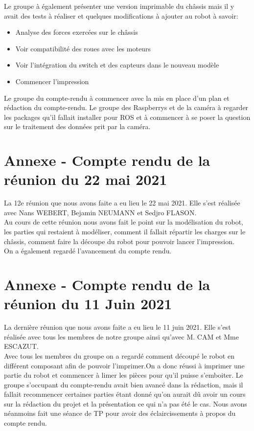 \documentclass{PackagerQualityN}
\begin{document}
Le groupe à également présenter une version imprimable du châssis mais il y avait des tests à réaliser et quelques modifications à ajouter au robot à savoir:
\begin{itemize}
    \item Analyse des forces exercées sur le châssis
    \item Voir compatibilité des roues avec les moteurs
    \item Voir l'intégration du switch et des capteurs dans le nouveau modèle
    \item Commencer l’impression
\end{itemize}

Le groupe du compte-rendu à commencer avec la mis en place d’un plan et rédaction du compte-rendu.
Le groupe des Raspberrys et de la caméra à regarder les packages qu'il fallait installer pour ROS et à commencer à se poser la question sur le traitement des données prit par la caméra.

\newp
\section*{Annexe - Compte rendu de la réunion du 22 mai 2021}
La 12e réunion que nous avons faite a eu lieu le 22 mai 2021. Elle s'est réalisée avec Nans WEBERT, Bejamin NEUMANN et Sedjro FLASON.\\

Au cours de cette réunion nous avons fait le point sur la modélisation du robot, les parties qui restaient à modéliser, comment il fallait répartir les charges sur le châssis, comment faire la découpe du robot pour pouvoir lancer l'impression. \\

On a également regardé l'avancement du compte rendu.

\newp
\section*{Annexe - Compte rendu de la réunion du 11 Juin 2021}
La dernière réunion que nous avons faite a eu lieu le 11 juin 2021. Elle s'est réalisée avec tous les membres de notre groupe ainsi qu'avec M. CAM et Mme ESCAZUT.\\ Avec tous les membres du groupe on a regardé comment découpé le robot en différent composant afin de pouvoir l'imprimer.On a donc réussi à imprimer une partie du robot et commencer à limer les pièces pour qu'il puisse s'emboiter.
Le groupe s'occupant du compte-rendu avait bien avancé dans la rédaction, mais il fallait recommencer certaines parties étant donné qu'on aurait dû avoir un cours sur la rédaction du projet et la présentation ce qui n'a pas été le cas. Nous avons néanmoins  fait une séance de TP pour avoir des éclaircissements à propos du compte rendu.\\
\end{document}
